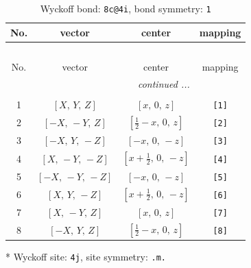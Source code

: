 \documentclass[fleqn,8pt]{jsarticle}
\begin{document}
\renewcommand{\arraystretch}{1.2}
\begin{longtable}{cccc}
\caption{Wyckoff bond: {\tt 8c@4i}, bond symmetry: {\tt 1}}
 \\
 \hline \hline
No. & vector & center & mapping \\ \hline \endfirsthead

\multicolumn{3}{l}{\tablename\ \thetable{}} \\
 \hline \hline
No. & vector & center & mapping \\ \hline \endhead

 \hline \hline
\multicolumn{3}{r}{\footnotesize\it continued ...} \\ \endfoot

 \hline \hline
\multicolumn{3}{r}{} \\ \endlastfoot

1 & $\left[ X,\, Y,\, Z \right]$ & $\left[ x,\, 0,\, z \right]$ & {\tt [1]} \\ \hline
2 & $\left[ - X,\, - Y,\, Z \right]$ & $\left[ \frac{1}{2} - x,\, 0,\, z \right]$ & {\tt [2]} \\ \hline
3 & $\left[ - X,\, Y,\, - Z \right]$ & $\left[ - x,\, 0,\, - z \right]$ & {\tt [3]} \\ \hline
4 & $\left[ X,\, - Y,\, - Z \right]$ & $\left[ x + \frac{1}{2},\, 0,\, - z \right]$ & {\tt [4]} \\ \hline
5 & $\left[ - X,\, - Y,\, - Z \right]$ & $\left[ - x,\, 0,\, - z \right]$ & {\tt [5]} \\ \hline
6 & $\left[ X,\, Y,\, - Z \right]$ & $\left[ x + \frac{1}{2},\, 0,\, - z \right]$ & {\tt [6]} \\ \hline
7 & $\left[ X,\, - Y,\, Z \right]$ & $\left[ x,\, 0,\, z \right]$ & {\tt [7]} \\ \hline
8 & $\left[ - X,\, Y,\, Z \right]$ & $\left[ \frac{1}{2} - x,\, 0,\, z \right]$ & {\tt [8]} \\
\end{longtable}
* Wyckoff site: {\tt 4j}, site symmetry: {\tt .m.}
\renewcommand{\arraystretch}{1.2}
\end{document}
